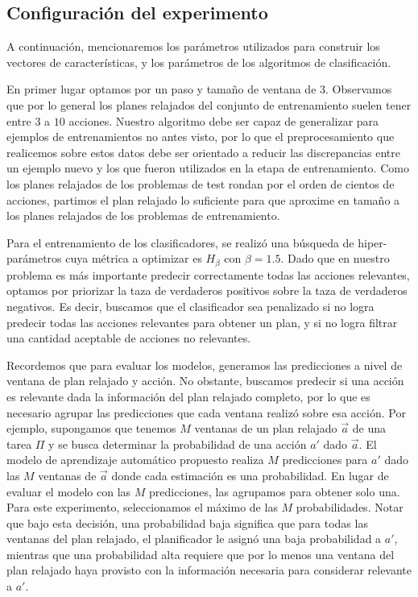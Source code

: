 \subsection{Configuración del experimento}

A continuación, mencionaremos los parámetros utilizados para construir los vectores de características, y los parámetros de los algoritmos de clasificación.

En primer lugar optamos por un paso y tamaño de ventana de $3$. Observamos que por lo general los planes relajados del conjunto de entrenamiento suelen tener entre $3$ a $10$ acciones. Nuestro algoritmo debe ser capaz de generalizar para ejemplos de entrenamientos no antes visto, por lo que el preprocesamiento que realicemos sobre estos datos debe ser orientado a reducir las discrepancias entre un ejemplo nuevo y los que fueron utilizados en la etapa de entrenamiento. Como los planes relajados de los problemas de test rondan por el orden de cientos de acciones, partimos el plan relajado lo suficiente para que aproxime en tamaño a los planes relajados de los problemas de entrenamiento.

Para el entrenamiento de los clasificadores, se realizó una búsqueda de hiper-parámetros cuya métrica a optimizar es $H_{\beta}$ con $\beta = 1.5$. Dado que en nuestro problema es más importante predecir correctamente todas las acciones relevantes, optamos por priorizar la taza de verdaderos positivos sobre la taza de verdaderos negativos. Es decir, buscamos que el clasificador sea penalizado si no logra predecir todas las acciones relevantes para obtener un plan, y si no logra filtrar una cantidad aceptable de acciones no relevantes.

Recordemos que para evaluar los modelos, generamos las predicciones a nivel de ventana de plan relajado y acción. No obstante, buscamos predecir si una acción es relevante dada la información del plan relajado completo, por lo que es necesario agrupar las predicciones que cada ventana realizó sobre esa acción. Por ejemplo, supongamos que tenemos $M$ ventanas de un plan relajado $\vec{a}$ de una tarea $\Pi$ y se busca determinar la probabilidad de una acción $a'$ dado $\vec{a}$. El modelo de aprendizaje automático propuesto realiza $M$ predicciones para $a'$ dado las $M$ ventanas de $\vec{a}$ donde cada estimación es una probabilidad. En lugar de evaluar el modelo con las $M$ predicciones, las agrupamos para obtener solo una. Para este experimento, seleccionamos el máximo de las $M$ probabilidades. Notar que bajo esta decisión, una probabilidad baja significa que para todas las ventanas del plan relajado, el planificador le asignó una baja probabilidad a $a'$, mientras que una probabilidad alta requiere que por lo menos una ventana del plan relajado haya provisto con la información necesaria para considerar relevante a $a'$.

